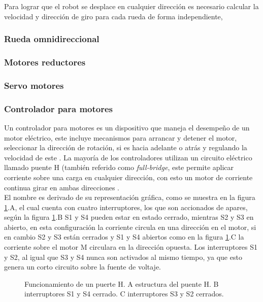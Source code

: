 \documentclass{iccmemoria}
\begin{document}
Para lograr que el robot se desplace en cualquier dirección es necesario calcular la velocidad y dirección de giro para cada rueda de forma independiente, 


\subsubsection{Rueda omnidireccional}

\subsubsection{Motores reductores}

\subsubsection{Servo motores}

\subsubsection{Controlador para motores}

Un controlador para motores es un dispositivo que maneja el desempeño de un motor eléctrico, este incluye mecanismos para arrancar y detener el motor, seleccionar la dirección de rotación, si es hacia adelante o atrás y regulando la velocidad de este \cite{siskind1963electrical}. La mayoría de los controladores utilizan un circuito eléctrico llamado puente H (también referido como \emph{full-bridge}, este permite aplicar corriente sobre una carga en cualquier dirección, con esto un motor de corriente continua girar en ambas direcciones \cite{williams2002microcontroller}.\\

El nombre es derivado de su representación gráfica, como se muestra en la figura \ref{fig:H bridge}.A, el cual cuenta con cuatro interruptores, los que son accionados de apares, según la figura \ref{fig:H bridge}.B S1 y S4 pueden estar en estado cerrado, mientras S2 y S3 en abierto, en esta configuración la corriente circula en una dirección en el motor, si en cambio S2 y S3 están cerrados y S1 y S4 abiertos como en la figura \ref{fig:H bridge}.C la corriente sobre el motor M circulara en la dirección opuesta. Los interruptores S1 y S2, al igual que S3 y S4 nunca son activados al mismo tiempo, ya que esto genera un corto circuito sobre la fuente de voltaje.\\

\begin{figure}[H]
  \centering
  
  \caption{Funcionamiento de un puerte H. A estructura del puente H. B interruptores S1 y S4 cerrado. C interruptores S3 y S2 cerrados.}
  \label{fig:H bridge}
\end{figure}
\end{document}

